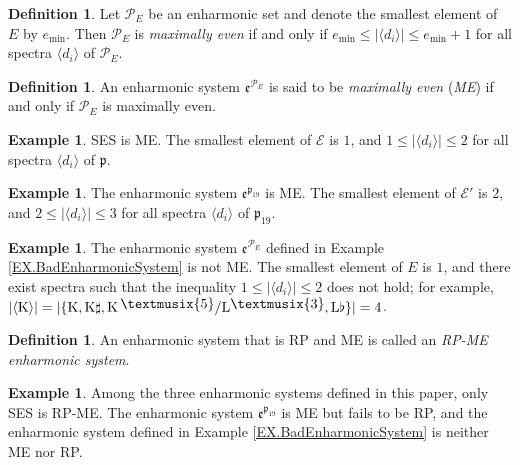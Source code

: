 \documentclass{article}
\theoremstyle{plain}
\theoremstyle{definition}
\newtheorem{definition}[theorem]{Definition}
\newtheorem{example}[theorem]{Example}
\theoremstyle{remark}
\newcommand*\doubleflat{\raisebox{.6ex}{\textmusix{3}}}
\newcommand*\doublesharp{\raisebox{.6ex}{\textmusix{5}}}
\begin{document}
\begin{definition}
	Let $\mathcal{P}_E$ be an enharmonic set and denote the smallest element of $E$ by $e_{\textrm{min}}$. Then $\mathcal{P}_E$ is \textit{maximally even} if and only if $e_{\textrm{min}}\le|\langle d_i\rangle|\le e_{\textrm{min}}+1$ for all spectra $\langle d_i\rangle$ of $\mathcal{P}_E$.
\end{definition}

\begin{definition}
	An enharmonic system $\mathfrak{e}^{\mathcal{P}_E}$ is said to be \textit{maximally even} (\textit{ME}) if and only if $\mathcal{P}_E$ is maximally even.
\end{definition}

\begin{example}
	SES is ME. The smallest element of $\mathcal{E}$ is $1$, and $1\le |\langle d_i\rangle|\le 2$ for all spectra $\langle d_i\rangle$ of $\mathfrak{p}$.
\end{example}

\begin{example}
	The enharmonic system $\mathfrak{e}^{\mathfrak{p}_{19}}$ is ME. The smallest element of $\mathcal{E}'$ is $2$, and $2\le |\langle d_i\rangle|\le 3$ for all spectra $\langle d_i\rangle$ of $\mathfrak{p}_{19}$.
\end{example}

\begin{example}
	The enharmonic system $\mathfrak{e}^{\mathcal{P}_E}$ defined in Example \ref{EX.BadEnharmonicSystem} is not ME. The smallest element of $E$ is $1$, and there exist spectra such that the inequality $1\le |\langle d_i\rangle|\le 2$ does not hold; for example, $|\langle\textrm{K}\rangle|=|\{\textrm{K},\textrm{K}\sharp,\textrm{K}\,\doublesharp/\textrm{L}\doubleflat,\textrm{L}\flat\}|=4$.
\end{example}

\begin{definition}
	An enharmonic system that is RP and ME is called an \textit{RP-ME enharmonic system}.
\end{definition}

\begin{example}
	Among the three enharmonic systems defined in this paper, only SES is RP-ME. The enharmonic system $\mathfrak{e}^{\mathfrak{p}_{19}}$ is ME but fails to be RP, and the enharmonic system defined in Example \ref{EX.BadEnharmonicSystem} is neither ME nor RP.
\end{example}
\end{document}
